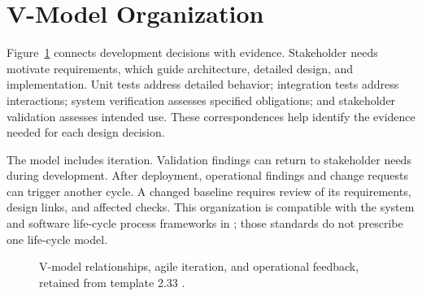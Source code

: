 \section{V-Model Organization}
Figure~\ref{Figure:VModel} connects development decisions with evidence.
Stakeholder needs motivate requirements, which guide architecture, detailed
design, and implementation. Unit tests address detailed behavior; integration
tests address interactions; system verification assesses specified obligations;
and stakeholder validation assesses intended use. These correspondences help
identify the evidence needed for each design decision.

The model includes iteration. Validation findings can return to stakeholder
needs during development. After deployment, operational findings and change
requests can trigger another cycle. A changed baseline requires review of its
requirements, design links, and affected checks. This organization is
compatible with the system and software life-cycle process frameworks in
\cite{ISO15288,ISO12207}; those standards do not prescribe one life-cycle model.

\begin{figure}[htbp]
\centering
\resizebox{\textwidth}{!}{}
\caption{V-model relationships, agile iteration, and operational feedback, retained from template 2.33 \cite{ArchitectureDesignTemplate233}.}
\label{Figure:VModel}
\end{figure}
